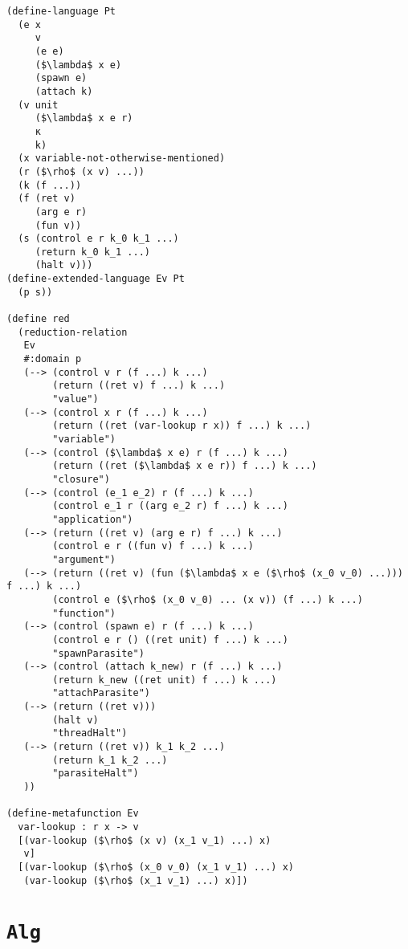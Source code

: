 \documentclass[12pt,a4paper,twoside,openright]{report}
\begin{document}
\begin{lstlisting}[xleftmargin=0pt, xrightmargin=0pt]
(define-language Pt
  (e x
     v
     (e e)
     ($\lambda$ x e)
     (spawn e)
     (attach k)
  (v unit
     ($\lambda$ x e r)
     κ
     k)
  (x variable-not-otherwise-mentioned)
  (r ($\rho$ (x v) ...))
  (k (f ...))
  (f (ret v)
     (arg e r)
     (fun v))
  (s (control e r k_0 k_1 ...)
     (return k_0 k_1 ...)
     (halt v)))
(define-extended-language Ev Pt
  (p s))

(define red
  (reduction-relation
   Ev
   #:domain p
   (--> (control v r (f ...) k ...)
        (return ((ret v) f ...) k ...)
        "value")
   (--> (control x r (f ...) k ...)
        (return ((ret (var-lookup r x)) f ...) k ...)
        "variable")
   (--> (control ($\lambda$ x e) r (f ...) k ...)
        (return ((ret ($\lambda$ x e r)) f ...) k ...)
        "closure")
   (--> (control (e_1 e_2) r (f ...) k ...)
        (control e_1 r ((arg e_2 r) f ...) k ...)
        "application")
   (--> (return ((ret v) (arg e r) f ...) k ...)
        (control e r ((fun v) f ...) k ...)
        "argument")
   (--> (return ((ret v) (fun ($\lambda$ x e ($\rho$ (x_0 v_0) ...))) f ...) k ...)
        (control e ($\rho$ (x_0 v_0) ... (x v)) (f ...) k ...)
        "function")
   (--> (control (spawn e) r (f ...) k ...)
        (control e r () ((ret unit) f ...) k ...)
        "spawnParasite")
   (--> (control (attach k_new) r (f ...) k ...)
        (return k_new ((ret unit) f ...) k ...)
        "attachParasite")
   (--> (return ((ret v)))
        (halt v)
        "threadHalt")
   (--> (return ((ret v)) k_1 k_2 ...)
        (return k_1 k_2 ...)
        "parasiteHalt")
   ))

(define-metafunction Ev
  var-lookup : r x -> v
  [(var-lookup ($\rho$ (x v) (x_1 v_1) ...) x)
   v]
  [(var-lookup ($\rho$ (x_0 v_0) (x_1 v_1) ...) x)
   (var-lookup ($\rho$ (x_1 v_1) ...) x)])
\end{lstlisting}

\chapter{\texttt{Alg}}\label{appalg}
\end{document}
